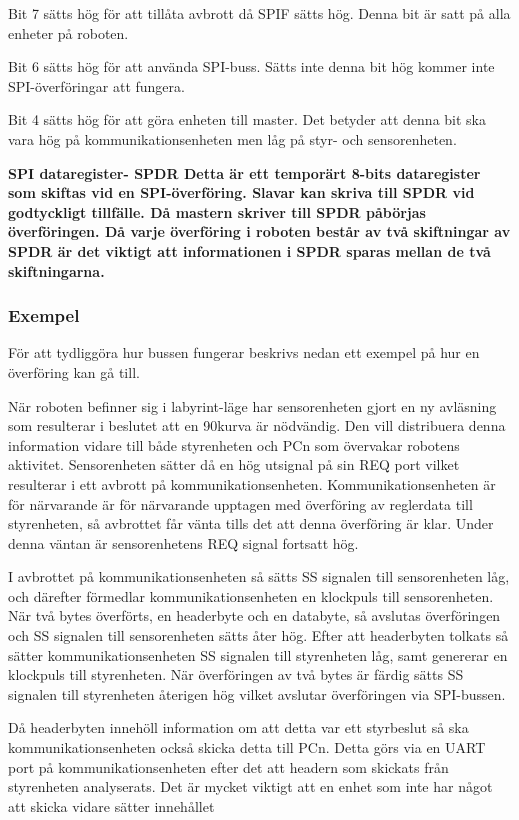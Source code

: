 Bit 7 sätts hög för att tillåta avbrott då SPIF sätts hög. Denna bit är satt 
på alla enheter på roboten.

Bit 6 sätts hög för att använda SPI-buss. Sätts inte denna bit hög kommer 
inte SPI-överföringar att fungera.

Bit 4 sätts hög för att göra enheten till master. Det betyder att denna bit 
ska vara hög på kommunikationsenheten men låg på styr- och sensorenheten.

\bf{SPI dataregister- SPDR}
Detta är ett temporärt 8-bits dataregister som skiftas vid en SPI-överföring. 
Slavar kan skriva till SPDR vid godtyckligt tillfälle. Då mastern skriver 
till SPDR påbörjas överföringen. Då varje överföring i roboten består av två 
skiftningar av SPDR är det viktigt att informationen i SPDR sparas mellan de 
två skiftningarna.


\subsubsection{Exempel}

För att tydliggöra hur bussen fungerar beskrivs nedan ett exempel på hur en 
överföring kan gå till.

När roboten befinner sig i labyrint-läge har sensorenheten gjort en ny 
avläsning som resulterar i beslutet att en 90\degree kurva är nödvändig. Den 
vill distribuera denna information vidare till både styrenheten och PCn som 
övervakar robotens aktivitet. Sensorenheten sätter då en hög utsignal på sin 
REQ port vilket resulterar i ett avbrott på kommunikationsenheten. 
Kommunikationsenheten är för närvarande är för närvarande upptagen med 
överföring av reglerdata till styrenheten, så avbrottet får vänta tills det 
att denna överföring är klar. Under denna väntan är sensorenhetens REQ signal 
fortsatt hög.

I avbrottet på kommunikationsenheten så sätts SS signalen till sensorenheten 
låg, och därefter förmedlar kommunikationsenheten en klockpuls till 
sensorenheten. När två bytes överförts, en headerbyte och en databyte, så 
avslutas överföringen och SS signalen till sensorenheten sätts åter hög. 
Efter att headerbyten tolkats så sätter kommunikationsenheten SS signalen 
till styrenheten låg, samt genererar en klockpuls till styrenheten. När 
överföringen av två bytes är färdig sätts SS signalen till styrenheten 
återigen hög vilket avslutar överföringen via SPI-bussen. 

Då headerbyten innehöll information om att detta var ett styrbeslut så ska 
kommunikationsenheten också skicka detta till PCn. Detta görs via en UART 
port på kommunikationsenheten efter det att headern som skickats från 
styrenheten analyserats. Det är mycket viktigt att en enhet som inte har 
något att skicka vidare sätter innehållet 

